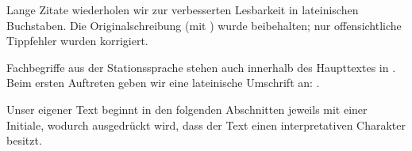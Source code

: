 Lange Zitate wiederholen wir zur verbesserten Lesbarkeit in lateinischen Buchstaben. Die Originalschreibung (mit ) wurde beibehalten; nur offensichtliche Tippfehler wurden korrigiert. 

Fachbegriffe aus der Stationssprache stehen auch innerhalb des Haupttextes in . Beim ersten Auftreten geben wir eine lateinische Umschrift an: . 

Unser eigener Text beginnt in den folgenden Abschnitten jeweils mit einer Initiale, wodurch ausgedrückt wird, dass der Text einen interpretativen Charakter besitzt.



